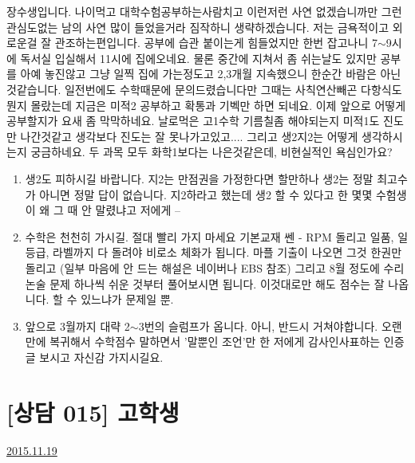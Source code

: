 \vspace{5mm}


    장수생입니다. 나이먹고 대학수험공부하는사람치고 이런저런 사연  없겠습니까만 그런 관심도없는 남의 사연 많이 들었을거라 짐작하니 생략하겠습니다.   저는 금욕적이고 외로운걸 잘 관조하는편입니다. 공부에 습관 붙이는게 힘들었지만 한번 잡고나니 7$\sim$9시에 독서실 입실해서 11시에 집에오네요. 물론 중간에 지쳐서 좀 쉬는날도 있지만 공부를 아예 놓진않고 그냥 일찍 집에 가는정도고 2,3개월 지속했으니 한순간 바람은 아닌것같습니다.  일전번에도 수학때문에 문의드렸습니다만 그때는 사칙연산빼곤 다항식도뭔지 몰랐는데 지금은 미적2 공부하고 확통과 기벡만 하면 되네요. 이제 앞으로 어떻게 공부할지가 요새 좀 막막하네요. 날로먹은 고1수학 기름칠좀 해야되는지 미적1도 진도만 나간것같고 생각보다 진도는 잘 못나가고있고....     그리고  생2지2는 어떻게 생각하시는지 궁금하네요. 두 과목 모두 화학1보다는 나은것같은데, 비현실적인 욕심인가요?

\begin{enumerate}
    \item 생2도 피하시길 바랍니다. 지2는 만점권을 가정한다면 할만하나 생2는 정말 최고수가 아니면 정말 답이 없습니다.
    지2하라고 했는데 생2 할 수 있다고 한 몇몇 수험생이 왜 그 때 안 말렸냐고 저에게 --
    \vspace{5mm}
    
    \item 수학은 천천히 가시길. 절대 빨리 가지 마세요
    기본교재 쎈 - RPM 돌리고 일품, 일등급, 라벨까지 다 돌려야 비로소 체화가 됩니다.
    마플 기출이 나오면 그것 한권만 돌리고 (일부 마음에 안 드는 해설은 네이버나 EBS 참조)
    그리고 8월 정도에 수리논술 문제 하나씩 쉬운 것부터 풀어보시면 됩니다.
    이것대로만 해도 점수는 잘 나옵니다. 할 수 있느냐가 문제일 뿐.
    \vspace{5mm}
    
    \item 앞으로 3월까지 대략 2$\sim$3번의 슬럼프가 옵니다. 아니, 반드시 거쳐야합니다.
    오랜만에 복귀해서 수학점수 말하면서 '말뿐인 조언'만 한 저에게 감사인사표하는 인증글 보시고 자신감 가지시길요.
    \vspace{5mm}
\end{enumerate}






\section{[상담 015] 고학생}
\href{https://www.kockoc.com/Apoc/501620}{2015.11.19}


